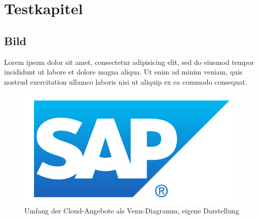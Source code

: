 \glsresetall


\seInhaltsverzeichnis[
einrueckung=ja,
gliederungsebenen=4
]




\chapter{Testkapitel}

\section{Bild}
Lorem ipsum dolor sit amet, consectetur adipisicing elit, sed do eiusmod tempor incididunt ut labore et dolore magna aliqua. Ut enim ad minim veniam, quis nostrud exercitation ullamco laboris nisi ut aliquip ex ea commodo consequat.
\begin{figure}[h]
\centering
\setlength{\unitlength}{1mm}
\includegraphics[width=15cm]{images/sap-logo.png}
\caption[Umfang der Cloud-Angebote als Venn-Diagramm]{Umfang der Cloud-Angebote als Venn-Diagramm, eigene Darstellung\label{fig:grundlagen:venn}}
\end{figure}

